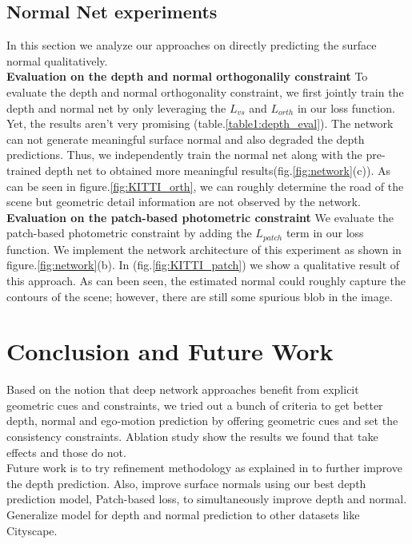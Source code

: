 \documentclass[10pt,twocolumn,letterpaper]{article}
\begin{document}
\subsection{Normal Net experiments}
In this section we analyze our approaches on directly predicting the surface normal qualitatively. 
\\
\textbf{Evaluation on the depth and normal orthogonalily constraint}
To evaluate the depth and normal orthogonality constraint, we first jointly train the depth and normal net by only leveraging the $L_{vs}$ and $L_{orth}$ in our loss function. Yet, the results aren't very promising (table.\ref{table1:depth_eval}). The network can not generate meaningful surface normal and also degraded the depth predictions. Thus, we independently train the normal net along with the pre-trained depth net to obtained more meaningful results(fig.\ref{fig:network}(c)). As can be seen in figure.\ref{fig:KITTI_orth}, we can roughly determine the road of the scene but geometric detail information are not observed by the network.
\\
\textbf{Evaluation on the patch-based photometric constraint}
We evaluate the patch-based photometric constraint by adding the $L_{patch}$ term in our loss function. We implement the network architecture of this experiment as shown in figure.\ref{fig:network}(b). In (fig.\ref{fig:KITTI_patch}) we show a qualitative result of this approach. As can been seen, the estimated normal could roughly capture the contours of the scene; however, there are still some spurious blob in the image. 



\section{Conclusion and Future Work}
Based on the notion that deep network approaches benefit from explicit geometric cues and constraints, we tried out a bunch of criteria to get better depth, normal and ego-motion prediction by offering geometric cues and set the consistency constraints. Ablation study show the results we found that take effects and those do not. \\
Future work is to try refinement methodology as explained in \cite{casser2018depth} to further improve the depth prediction. Also, improve surface normals using our best depth prediction model, 
Patch-based loss, to simultaneously improve depth and normal.
Generalize model for depth and normal prediction to other datasets like Cityscape.
\end{document}
